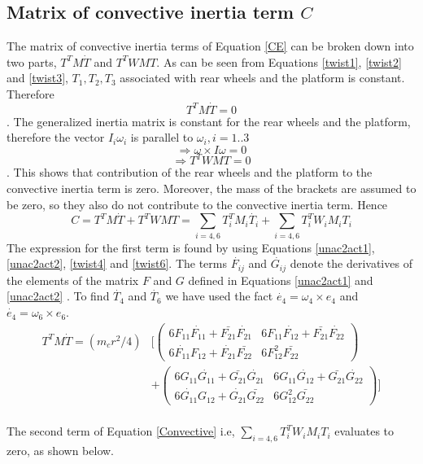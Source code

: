 \subsection{Matrix of convective inertia term $C$}
The matrix of convective inertia terms of Equation \ref{CE} can be broken down into two parts, $T^TM\dot{T}$ and $T^TWMT$.  As can be seen from Equations \ref{twist1}, \ref{twist2} and \ref{twist3},  $T_1,T_2,T_3$ associated with rear wheels and the platform is constant. Therefore \[T^TM\dot{T}=0\]. The generalized inertia matrix  is constant for the rear wheels and the platform, therefore the vector $I_i\omega_i$ is parallel to  $\omega_i, i=1..3$ \[\Rightarrow\omega\times I\omega=0\] \[\Rightarrow T^TWMT =0\]. This shows that contribution of the rear wheels and the platform  to the convective inertia term is zero. Moreover, the mass of the brackets are assumed to be zero, so they also do not contribute to the convective inertia term. Hence
\begin{equation}
\label{Convective}
C=T^TM\dot{T}+T^TWMT=\sum_{i=4,6}T^T_iM_i\dot{T_i}+\sum_{i=4,6}T_i^TW_iM_iT_i
\end{equation}
The expression for the first term is found by using Equations \ref{unac2act1}, \ref{unac2act2}, \ref{twist4} and \ref{twist6}. The terms $\dot{F_{ij}}$ and $\dot{G_{ij}}$ denote the derivatives of the elements of the matrix $F$ and $G$ defined in Equations \ref{unac2act1} and \ref{unac2act2} . To find $\dot{T_4}$ and  $ \dot{T_6}$ we have used the fact $\dot{e_4}=\omega_4 \times e_4 $ and $\dot{e_4}=\omega_6 \times e_6 $. 
\begin{equation}
\label{corr1}
\begin{split}
T^TM\dot{T}=
(m_cr^2/4)& \biggl[ \begin{pmatrix}
6F_{11}\dot{F_{11}}+\bar{F_{21}}\dot{F_{21}} & 6F_{11}\dot{F_{12}}+\bar{F_{21}}\dot{F_{22}}\\
6\dot{F_{11}}F_{12}+\dot{F_{21}}\bar{F_{22}} & 6F_{12}^2\bar{F_{22}}
\end{pmatrix}\\
&+\begin{pmatrix}
6G_{11}\dot{G_{11}}+\bar{G_{21}}\dot{G_{21}} & 6G_{11}\dot{G_{12}}+\bar{G_{21}}\dot{G_{22}}\\
6\dot{G_{11}}G_{12}+\dot{G_{21}}\bar{G_{22}} & 6G_{12}^2\bar{G_{22}}
\end{pmatrix} \biggr]
\end{split}
\end{equation}
\\
The second term of Equation \ref{Convective} i.e, $ \sum_{i=4,6}T_i^TW_iM_iT_i$ evaluates to zero, as shown below. 

